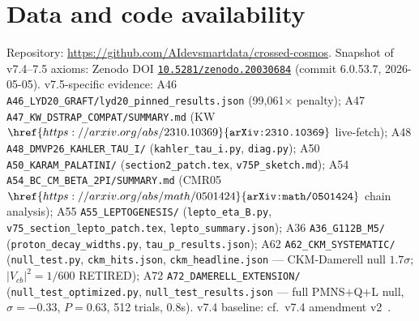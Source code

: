 \documentclass[a4paper,11pt]{article}
\newcommand{\arXiv}[1]{\href{https://arxiv.org/abs/#1}{\texttt{arXiv:#1}}}
\newcommand{\Zeno}{\href{https://doi.org/10.5281/zenodo.20030684}{\texttt{10.5281/zenodo.20030684}}}
\theoremstyle{definition}
\theoremstyle{remark}
\begin{document}
\section*{Data and code availability}

Repository: \url{https://github.com/AIdevsmartdata/crossed-cosmos}.
Snapshot of v7.4--7.5 axioms: Zenodo DOI \Zeno{} (commit
6.0.53.7, 2026-05-05).  v7.5-specific evidence:
A46 \texttt{A46\_LYD20\_GRAFT/lyd20\_pinned\_results.json}
(99,061$\times$ penalty);
A47 \texttt{A47\_KW\_DSTRAP\_COMPAT/SUMMARY.md}
(KW $\arXiv{2310.10369}$ live-fetch);
A48 \texttt{A48\_DMVP26\_KAHLER\_TAU\_I/}
(\texttt{kahler\_tau\_i.py}, \texttt{diag.py});
A50 \texttt{A50\_KARAM\_PALATINI/}
(\texttt{section2\_patch.tex}, \texttt{v75P\_sketch.md});
A54 \texttt{A54\_BC\_CM\_BETA\_2PI/SUMMARY.md}
(CMR05 $\arXiv{math/0501424}$ chain analysis);
A55 \texttt{A55\_LEPTOGENESIS/}
(\texttt{lepto\_eta\_B.py},
\texttt{v75\_section\_lepto\_patch.tex},
\texttt{lepto\_summary.json});
A36 \texttt{A36\_G112B\_M5/}
(\texttt{proton\_decay\_widths.py},
\texttt{tau\_p\_results.json});
A62 \texttt{A62\_CKM\_SYSTEMATIC/}
(\texttt{null\_test.py}, \texttt{ckm\_hits.json},
\texttt{ckm\_headline.json} --- CKM-Damerell null $1.7\sigma$;
$|V_{cb}|^2=1/600$ RETIRED);
A72 \texttt{A72\_DAMERELL\_EXTENSION/}
(\texttt{null\_test\_optimized.py},
\texttt{null\_test\_results.json} --- full PMNS$+$Q$+$L null,
$\sigma=-0.33$, $P=0.63$, 512 trials, 0.8s).
v7.4 baseline: cf.\ v7.4 amendment v2~\cite{V74amend}.
\end{document}
